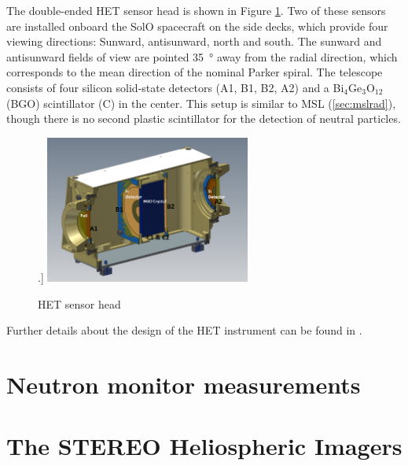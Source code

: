 The double-ended \ac{HET} sensor head is shown in Figure \ref{fig:het-sensorhead}. Two of these sensors are installed onboard the \ac{SolO} spacecraft on the side decks, which provide four viewing directions: Sunward, antisunward, north and south. The sunward and antisunward fields of view are pointed \SI{35}{\degree} away from the radial direction, which corresponds to the mean direction of the nominal Parker spiral. The telescope consists of four silicon solid-state detectors (A1, B1, B2, A2) and a Bi$_4$Ge$_3$O$_{12}$ (BGO) scintillator (C) in the center. This setup is similar to \ac{MSL} (\autoref{sec:mslrad}), though there is no second plastic scintillator for the detection of neutral particles.



\begin{figure}
    \centering
    \subfloat[\acs{CAD} rendering of the \ac{HET} sensor head. Taken from \protect\citet[Fig. 31]{RodriguezPacheco-2019-EPD}.]{
    	\includegraphics[width=0.6\textwidth]{images/het.png}
    	\label{subfig:het-sensorhead-cad}
    }\\
    \caption[\acs{HET} sensor head]{\acs{HET} sensor head}
    \label{fig:het-sensorhead}
\end{figure}

Further details about the design of the \ac{HET} instrument can be found in \cite{Elftmann-2020-PhD}. 

\section{Neutron monitor measurements}
\label{sec:neutronmonitors}

\section{The STEREO Heliospheric Imagers}
\label{sec:stereohi}

